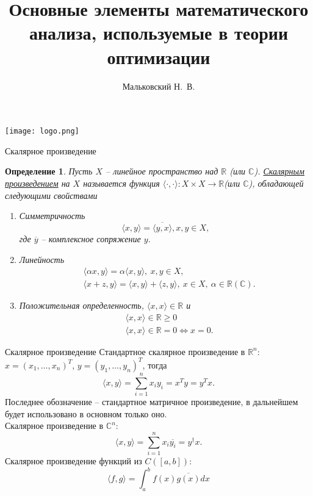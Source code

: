 \documentclass[10pt, handout]{beamer}
\author{Мальковский Н.~В.}
\title[Основы анализа]{Основные элементы математического анализа, используемые в теории оптимизации}
\institute[СПбАУ]{Санкт-Петербургский Академический Университет}
\date{}
\newtheorem{definition_ru}{Определение}[]
\begin{document}
\begin{frame}
\titlepage
\centering
\texttt{[image: logo.png]}
\end{frame}


\begin{frame}{Скалярное произведение}
\begin{definition_ru}
Пусть $X$ -- линейное пространство над $\mathbb{R}$ (или $\mathbb{C}$). \underline{Скалярным произведением} на $X$ называется функция $\langle\cdot, \cdot\rangle:X\times X\rightarrow \mathbb{R}$(или $\mathbb{C}$), обладающей следующими свойствами
\begin{enumerate}
\item Симметричность
$$
\langle x,y\rangle=\overline{\langle y,x\rangle}, x,y\in X,
$$
где $\overline{y}$ -- комплексное сопряжение $y$.
\item Линейность
\begin{align*}
&\langle\alpha x,y\rangle=\alpha\langle x, y\rangle, ~x,y\in X, \\
&\langle x+z,y\rangle=\langle x, y\rangle+\langle z, y\rangle,~x\in X,~\alpha\in \mathbb{R}(\mathbb{C}).
\end{align*}
\item Положительная определенность, $\langle x, x\rangle\in \mathbb{R}$ и
\begin{align*}
&\langle x, x\rangle\in \mathbb{R}\geq 0\\
&\langle x, x\rangle\in \mathbb{R}=0\Leftrightarrow x=0.
\end{align*}

\end{enumerate}
\end{definition_ru}

\end{frame}

\begin{frame}{Скалярное произведение}
Стандартное скалярное произведение в $\mathbb{R}^n$: $x=(x_1, \ldots, x_n)^T$, $y=(y_1, \ldots, y_n)^T$, тогда
$$
\langle x, y \rangle=\sum_{i=1}^nx_iy_i=x^Ty=y^Tx.
$$
Последнее обозначение -- стандартное матричное произведение, в дальнейшем будет использовано в основном только оно.\\
\pause
\vspace{1em}
Скалярное произведение в $\mathbb{C}^n$:
$$
\langle x, y \rangle=\sum_{i=1}^nx_i\overline{y_i}=y^\dagger x.
$$
\pause
\vspace{1em}
Скалярное произведение функций из $C([a, b])$:
$$
\langle f, g \rangle=\int_a^bf(x)\overline{g(x)}dx
$$
\end{frame}
\end{document}
